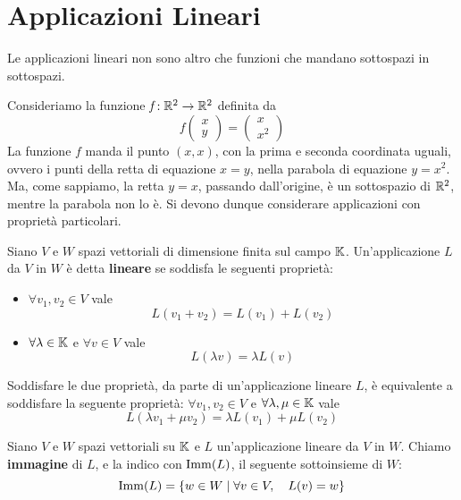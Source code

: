 \section{Applicazioni Lineari}
Le applicazioni lineari non sono altro che funzioni che mandano sottospazi in sottospazi.

\begin{example}
	Consideriamo la funzione $\textit{f} : \mathbb{R}^2 \to \mathbb{R}^2$ definita da
	\[
		f \begin{pmatrix}
			x \\ y
		\end{pmatrix}
		=
		\begin{pmatrix}
			x \\ x^2
		\end{pmatrix}
	\]
	La funzione $f$ manda il punto $(x, x)$, con la prima e seconda coordinata uguali, ovvero i punti della
	retta di equazione $x = y$, nella parabola di equazione $y = x^2$. Ma, come sappiamo, la retta $y = x$,
	passando dall'origine, è un sottospazio di $\mathbb{R}^2$, mentre la parabola non lo è. Si devono dunque
	considerare applicazioni con proprietà particolari.
\end{example}

\begin{definition}
	Siano $V$ e $W$ spazi vettoriali di dimensione finita sul campo $\mathbb{K}$. Un'applicazione $L$ da $V$
	in $W$ è detta \textbf{lineare} se soddisfa le seguenti proprietà:
	\begin{itemize}
		\item $\forall v_1, v_2 \in V$ vale
		      \[ L(v_1 + v_2) = L(v_1) + L(v_2) \]
		\item $\forall \lambda \in \mathbb{K}$ e $\forall v \in V$ vale
		      \[ L(\lambda v) = \lambda L(v) \]
	\end{itemize}
\end{definition}

\begin{observation}
	Soddisfare le due proprietà, da parte di un'applicazione lineare $L$, è equivalente a soddisfare la seguente
	proprietà: $\forall v_1, v_2 \in V$ e $\forall \lambda, \mu \in \mathbb{K}$ vale
	\[ L(\lambda v_1 + \mu v_2) = \lambda L(v_1) + \mu L(v_2) \]
\end{observation}

\begin{definition}
	Siano $V$ e $W$ spazi vettoriali su $\mathbb{K}$ e $L$ un'applicazione lineare da $V$ in $W$. Chiamo
	\textbf{immagine} di $L$, e la indico con $\operatorname{Imm}(L)$, il seguente sottoinsieme di $W$:
	\[ \operatorname{Imm}(L) = \{w \in W \mid \forall v \in V, \quad L(v) = w\} \]
\end{definition}

